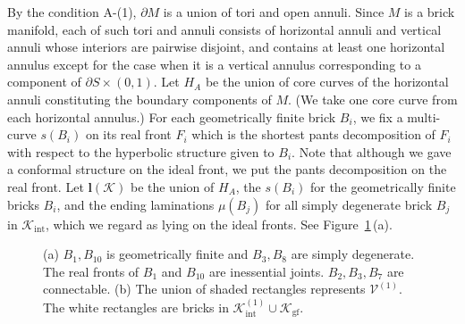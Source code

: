 \documentclass{amsart}
\theoremstyle{definition}
\numberwithin{figure}{section}
\numberwithin{equation}{section}
\def\ck{\mathcal{K}}
\def\cv{\mathcal{V}}
\def\part{\partial}
\begin{document}
By the condition A-(1), $\part M$ is a union of tori and open annuli.
Since $M$ is a brick manifold, each of such tori and annuli consists of horizontal annuli and vertical annuli whose interiors are pairwise disjoint, and contains at least one horizontal annulus except for the case when it is a vertical annulus corresponding to a component of $\partial S \times (0,1)$.
Let $H_A$ be the union of core curves of the horizontal annuli constituting the boundary components of $M$.
(We take one core curve from each horizontal annulus.)
For each geometrically finite brick $B_i$, we fix a multi-curve $s(B_i)$ on its real front $F_i$ which is the shortest pants decomposition of $F_i$ with respect to the hyperbolic structure given to $B_i$.
Note that although we gave a conformal structure on the ideal front, we put the pants decomposition on the real front.
Let $\boldsymbol{l}(\ck)$ be the union of $H_A$, the $s(B_i)$ for the geometrically finite bricks $B_i$,  and the ending laminations 
$\mu(B_j)$ for all simply degenerate brick $B_j$ in $\ck_{\mathrm{int}}$, which we regard as lying on the ideal fronts.
See Figure\ \ref{fig2_5}\,(a).
\begin{figure}[hbtp]
\centering
{}
\caption{(a) $B_1,B_{10}$ is geometrically finite and $B_3,B_8$ are simply degenerate.
The real fronts of $B_1$ and $B_{10}$ are inessential joints.
$B_2,B_3,B_7$ are connectable.
(b) The union of shaded rectangles represents $\cv^{(1)}$.
The white rectangles are bricks in $\ck_{\mathrm{int}}^{(1)}\cup \ck_{\mathrm{gf}}$.
}
\label{fig2_5}
\end{figure}
\end{document}
